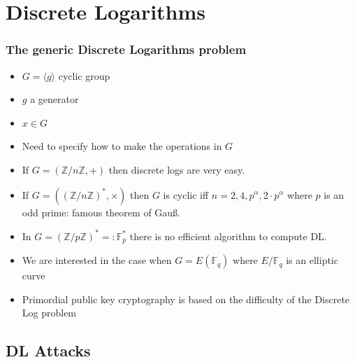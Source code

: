 \documentclass[10pt,handout]{beamer} %
\newcommand{\Z}{\mathbb Z}
\newcommand{\F}{\mathbb F}
\theoremstyle{definition}
\begin{document}
\section{Discrete Logarithms} 


\begin{frame}
\frametitle{The generic Discrete Logarithms problem}

\begin{itemize}
 \item  $G=\langle g\rangle$ cyclic group
 \item $g$ a generator
 \item $x\in G$
\end{itemize}


\begin{itemize}[<+-| alert@+>]
 \item {Need to specify how to make the operations in $G$}
\item {If $G=\left(\Z/n\Z,+\right)$ then discrete logs are very easy.}
\item If $G=((\Z/n\Z)^*,\times)$ then $G$ is cyclic iff $n=2,4,p^\alpha,2\cdot p^\alpha$
where
$p$ is an odd prime: famous theorem of Gau\ss.
\item In $G=(\Z/p\Z)^*=:\F_p^*$ there is no efficient algorithm to compute DL.
\item \alert{We are interested in the case when $G=E(\F_q)$ where $E/\F_q$ is an elliptic curve}
\item Primordial public key cryptography is based on the difficulty of the Discrete Log problem
\end{itemize}
\end{frame}

\subsection{DL Attacks}
\end{document}
